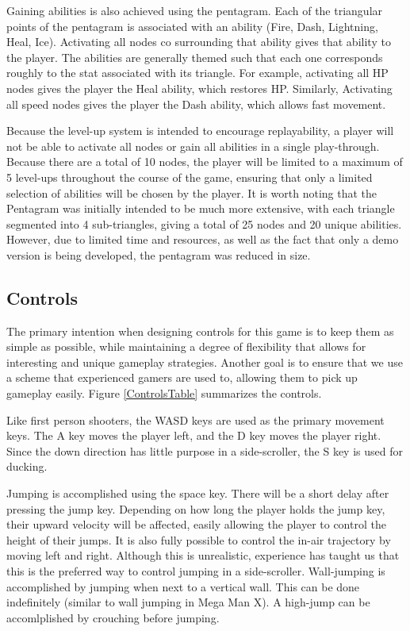 \documentclass{article}
\begin{document}
Gaining abilities is also achieved using the pentagram.  Each of the triangular points of the pentagram is associated with an ability (Fire, Dash, Lightning, Heal, Ice).  Activating all nodes co surrounding that ability gives that ability to the player.  The abilities are generally themed such that each one corresponds roughly to the stat associated with its triangle.  For example, activating all HP nodes gives the player the Heal ability, which restores HP.  Similarly, Activating all speed nodes gives the player the Dash ability, which allows fast movement.

Because the level-up system is intended to encourage replayability, a player will not be able to activate all nodes or gain all abilities in a single play-through.  Because there are a total of 10 nodes, the player will be limited to a maximum of 5 level-ups throughout the course of the game, ensuring that only a limited selection of abilities will be chosen by the player.  It is worth noting that the Pentagram was initially intended to be much more extensive, with each triangle segmented into 4 sub-triangles, giving a total of 25 nodes and 20 unique abilities.  However, due to limited time and resources, as well as the fact that only a demo version is being developed, the pentagram was reduced in size.

\subsection{Controls}

The primary intention when designing controls for this game is to keep them as simple as possible, while maintaining a degree of flexibility that allows for interesting and unique gameplay strategies.  Another goal is to ensure that we use a scheme that experienced gamers are used to, allowing them to pick up gameplay easily.  Figure \ref{ControlsTable} summarizes the controls.

Like first person shooters, the WASD keys are used as the primary movement keys.  The A key moves the player left, and the D key moves the player right.  Since the down direction has little purpose in a side-scroller, the S key is used for ducking.

Jumping is accomplished using the space key.  There will be a short delay after pressing the jump key.  Depending on how long the player holds the jump key, their upward velocity will be affected, easily allowing the player to control the height of their jumps.  It is also fully possible to control the in-air trajectory by moving left and right.  Although this is unrealistic, experience has taught us that this is the preferred way to control jumping in a side-scroller.  Wall-jumping is accomplished by jumping when next to a vertical wall.  This can be done indefinitely (similar to wall jumping in Mega Man X).  A high-jump can be accomlplished by crouching before jumping.
\end{document}
